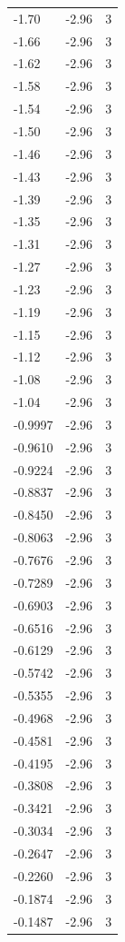 \begin{longtable}{lrr}
  -1.70 & -2.96 & 3 \\
  -1.66 & -2.96 & 3 \\
  -1.62 & -2.96 & 3 \\
  -1.58 & -2.96 & 3 \\
  -1.54 & -2.96 & 3 \\
  -1.50 & -2.96 & 3 \\
  -1.46 & -2.96 & 3 \\
  -1.43 & -2.96 & 3 \\
  -1.39 & -2.96 & 3 \\
  -1.35 & -2.96 & 3 \\
  -1.31 & -2.96 & 3 \\
  -1.27 & -2.96 & 3 \\
  -1.23 & -2.96 & 3 \\
  -1.19 & -2.96 & 3 \\
  -1.15 & -2.96 & 3 \\
  -1.12 & -2.96 & 3 \\
  -1.08 & -2.96 & 3 \\
  -1.04 & -2.96 & 3 \\
  -0.9997 & -2.96 & 3 \\
  -0.9610 & -2.96 & 3 \\
  -0.9224 & -2.96 & 3 \\
  -0.8837 & -2.96 & 3 \\
  -0.8450 & -2.96 & 3 \\
  -0.8063 & -2.96 & 3 \\
  -0.7676 & -2.96 & 3 \\
  -0.7289 & -2.96 & 3 \\
  -0.6903 & -2.96 & 3 \\
  -0.6516 & -2.96 & 3 \\
  -0.6129 & -2.96 & 3 \\
  -0.5742 & -2.96 & 3 \\
  -0.5355 & -2.96 & 3 \\
  -0.4968 & -2.96 & 3 \\
  -0.4581 & -2.96 & 3 \\
  -0.4195 & -2.96 & 3 \\
  -0.3808 & -2.96 & 3 \\
  -0.3421 & -2.96 & 3 \\
  -0.3034 & -2.96 & 3 \\
  -0.2647 & -2.96 & 3 \\
  -0.2260 & -2.96 & 3 \\
  -0.1874 & -2.96 & 3 \\
  -0.1487 & -2.96 & 3 \\

\end{longtable}
